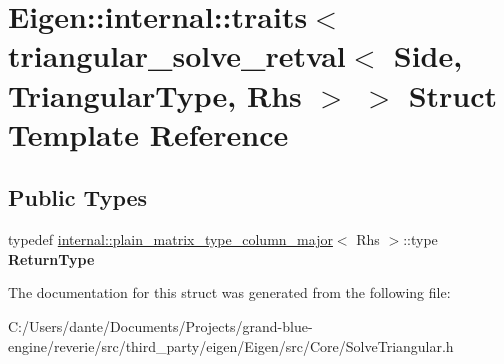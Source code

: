 \hypertarget{struct_eigen_1_1internal_1_1traits_3_01triangular__solve__retval_3_01_side_00_01_triangular_type_00_01_rhs_01_4_01_4}{}\section{Eigen\+::internal\+::traits$<$ triangular\+\_\+solve\+\_\+retval$<$ Side, Triangular\+Type, Rhs $>$ $>$ Struct Template Reference}
\label{struct_eigen_1_1internal_1_1traits_3_01triangular__solve__retval_3_01_side_00_01_triangular_type_00_01_rhs_01_4_01_4}
\subsection*{Public Types}
\begin{DoxyCompactItemize}
\item 
\mbox{\label{struct_eigen_1_1internal_1_1traits_3_01triangular__solve__retval_3_01_side_00_01_triangular_type_00_01_rhs_01_4_01_4_abc717df63c78808ab97f24831f702190}} 
typedef \mbox{\hyperlink{struct_eigen_1_1internal_1_1plain__matrix__type__column__major}{internal\+::plain\+\_\+matrix\+\_\+type\+\_\+column\+\_\+major}}$<$ Rhs $>$\+::type {\bfseries Return\+Type}
\end{DoxyCompactItemize}


The documentation for this struct was generated from the following file\+:\begin{DoxyCompactItemize}
\item 
C\+:/\+Users/dante/\+Documents/\+Projects/grand-\/blue-\/engine/reverie/src/third\+\_\+party/eigen/\+Eigen/src/\+Core/Solve\+Triangular.\+h\end{DoxyCompactItemize}
